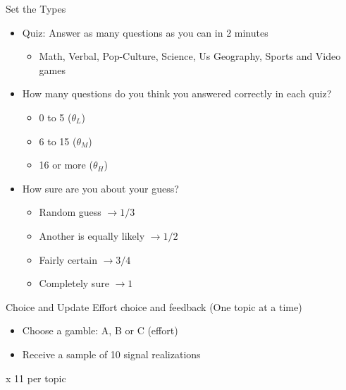\documentclass[aspectratio=169]{beamer}
\begin{document}
\begin{frame}{Set the Types}
    \bigskip
    \begin{itemize}
        \item Quiz: Answer as many questions as you can in 2 minutes\\
        \begin{itemize}
            \item Math, Verbal, Pop-Culture, Science, Us Geography, Sports and Video games\\
        \end{itemize}
        \bigskip

        \item How many questions do you think you answered correctly in each quiz?\\
        \begin{itemize}
            \item 0 to 5 ($\theta_L$)
            \item 6 to 15 ($\theta_M$)
            \item 16 or more ($\theta_H$)
        \end{itemize}
        \item How sure are you about your guess?
        \begin{itemize}
            \item Random guess $\to 1/3$
            \item Another is equally likely $\to 1/2$
            \item Fairly certain $\to 3/4$
            \item Completely sure $\to 1$
        \end{itemize}
    \end{itemize}

\end{frame}


\begin{frame}{Choice and Update}
    Effort choice and feedback (One topic at a time)\\
    \bigskip
    \begin{itemize}
        \item Choose a gamble: A, B or C (effort)
        \item Receive a sample of 10 signal realizations
    \end{itemize}
    \bigskip
    x 11 per topic

\end{frame}
\end{document}
